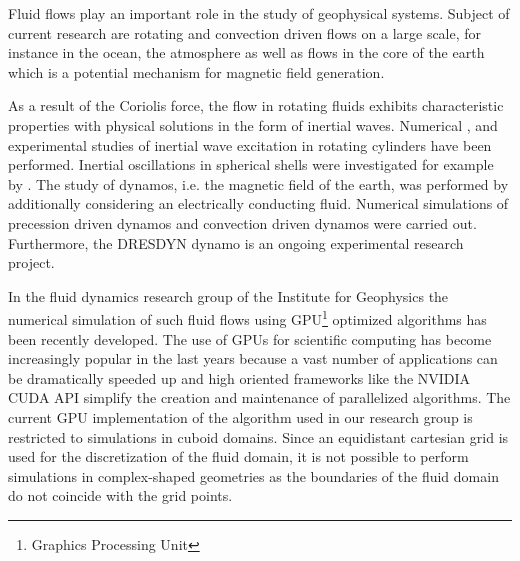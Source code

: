 
Fluid flows play an important role in the study of geophysical systems.
Subject of current research are rotating and convection driven flows on a large scale, for instance in the ocean, the atmosphere as
well as flows in the core of the earth which is a potential mechanism for magnetic field generation.

As a result of the Coriolis force, the flow in rotating fluids exhibits characteristic properties with
physical solutions in the form of inertial waves.
Numerical \citep{Sauret2012}, \citep{Duguet} and experimental
studies \citep{Fultz1959} of inertial wave excitation in rotating cylinders have been performed.
Inertial oscillations in spherical shells were investigated for example by \citep{Tilgner1999}.
The study of dynamos, i.e. the magnetic field of the earth, was performed by additionally
considering an electrically conducting fluid.
Numerical simulations of precession driven dynamos \citep{Tilgner2005}
and convection driven dynamos \citep{Tilgner2012} were carried out. Furthermore,
the DRESDYN dynamo \citep{Stefani2015} is an ongoing experimental research project.

In the fluid dynamics research group of the Institute for Geophysics
the numerical simulation of such fluid flows using GPU\footnote{Graphics Processing Unit} optimized algorithms has been recently developed.
The use of GPUs for scientific computing has become increasingly popular in the last years because
a vast number of applications  can  be dramatically speeded up and
high oriented frameworks like the NVIDIA CUDA API simplify the creation
and maintenance of parallelized algorithms.
The current GPU implementation of the algorithm used in our research group is restricted
to simulations in cuboid domains.
Since an equidistant cartesian grid is used for the discretization of the fluid
domain, it is not possible to perform simulations in complex-shaped geometries
as the boundaries of the fluid domain  do not coincide with the grid points.

